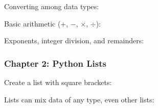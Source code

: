 \documentclass[letterpaper,10pt,english]{jupyterBook}
\begin{document}
\sphinxAtStartPar
Converting among data types:

\begin{sphinxVerbatim}[commandchars=\\\{\}]
        
\end{sphinxVerbatim}

\sphinxAtStartPar
Basic arithmetic (\(+\), \(-\), \(\times\), \(\div\)):

\begin{sphinxVerbatim}[commandchars=\\\{\}]
           
\end{sphinxVerbatim}

\sphinxAtStartPar
Exponents, integer division, and remainders:

\begin{sphinxVerbatim}[commandchars=\\\{\}]
        
\end{sphinxVerbatim}


\subsubsection{Chapter 2: Python Lists}
\label{\detokenize{big-cheat-sheet:chapter-2-python-lists}}
\sphinxAtStartPar
Create a list with square brackets:

\begin{sphinxVerbatim}[commandchars=\\\{\}]
  \PYG{p}{[}          \PYG{p}{]}
\end{sphinxVerbatim}

\sphinxAtStartPar
Lists can mix data of any type, even other lists:
\end{document}
